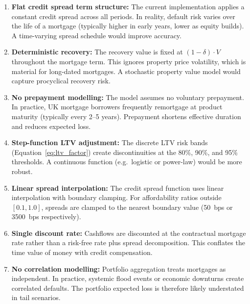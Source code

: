 \documentclass[11pt,a4paper]{article}
\begin{document}
\begin{enumerate}[nosep]
    \item \textbf{Flat credit spread term structure:} The current implementation applies
          a constant credit spread across all periods. In reality, default risk varies
          over the life of a mortgage (typically higher in early years, lower as equity
          builds). A time-varying spread schedule would improve accuracy.

    \item \textbf{Deterministic recovery:} The recovery value is fixed at
          $(1 - \delta) \cdot V$ throughout the mortgage term. This ignores property
          price volatility, which is material for long-dated mortgages. A stochastic
          property value model would capture procyclical recovery risk.

    \item \textbf{No prepayment modelling:} The model assumes no voluntary prepayment.
          In practice, UK mortgage borrowers frequently remortgage at product maturity
          (typically every 2--5 years). Prepayment shortens effective duration and
          reduces expected loss.

    \item \textbf{Step-function LTV adjustment:} The discrete LTV risk bands
          (Equation~\eqref{eq:ltv_factor}) create discontinuities at the 80\%, 90\%,
          and 95\% thresholds. A continuous function (e.g.\ logistic or power-law)
          would be more robust.

    \item \textbf{Linear spread interpolation:} The credit spread function uses linear
          interpolation with boundary clamping. For affordability ratios outside
          $[0.1, 1.0]$, spreads are clamped to the nearest boundary value (50~bps
          or 3500~bps respectively).

    \item \textbf{Single discount rate:} Cashflows are discounted at the contractual
          mortgage rate rather than a risk-free rate plus spread decomposition. This
          conflates the time value of money with credit compensation.

    \item \textbf{No correlation modelling:} Portfolio aggregation treats mortgages as
          independent. In practice, systemic flood events or economic downturns create
          correlated defaults. The portfolio expected loss is therefore likely
          understated in tail scenarios.


\end{enumerate}
\end{document}
